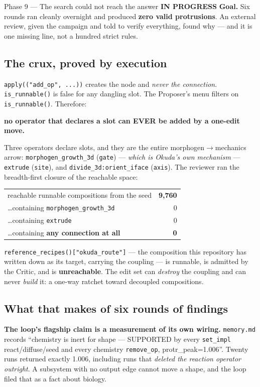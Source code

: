\documentclass[11pt,a4paper]{article}
\newcommand{\code}[1]{\texttt{#1}}
\newcommand{\prog}{\textcolor{warn}{\textbf{IN PROGRESS}}}
\begin{document}
\begin{phasebox}{Phase 9 --- The search could not reach the answer \hfill \prog}
\textbf{Goal.} Six rounds ran cleanly overnight and produced \textbf{zero valid protrusions}. An
external review, given the campaign and told to verify everything, found why --- and it is one
missing line, not a hundred strict rules.

\subsection*{The crux, proved by execution}
\code{apply(("add\_op", ...))} creates the node and \emph{never the connection}.
\code{is\_runnable()} is false for any dangling slot. The Proposer's menu filters on
\code{is\_runnable()}. Therefore:

\begin{center}\textbf{no operator that declares a slot can EVER be added by a one-edit move.}\end{center}

\noindent Three operators declare slots, and they are the entire morphogen$\to$mechanics arrow:
\code{morphogen\_growth\_3d} (\code{gate}) --- \emph{which is Okuda's own mechanism} ---
\code{extrude} (\code{site}), and \code{divide\_3d:orient\_iface} (\code{axis}). The reviewer ran
the breadth-first closure of the reachable space:

\begin{center}\small
\begin{tabular}{@{}lr@{}}
\toprule
reachable runnable compositions from the seed & \textbf{9{,}760} \\
\ldots containing \code{morphogen\_growth\_3d} & 0 \\
\ldots containing \code{extrude} & 0 \\
\ldots containing \textbf{any connection at all} & \textbf{0} \\
\bottomrule
\end{tabular}
\end{center}

\noindent \code{reference\_recipes()["okuda\_route"]} --- the composition this repository has
written down as its target, carrying the coupling --- is runnable, is admitted by the Critic, and
is \textbf{unreachable}. The edit set can \emph{destroy} the coupling and can never \emph{build}
it: a one-way ratchet toward decoupled compositions.

\subsection*{What that makes of six rounds of findings}
\textbf{The loop's flagship claim is a measurement of its own wiring.} \code{memory.md} records
``chemistry is inert for shape --- SUPPORTED by every \code{set\_impl} react/diffuse/seed and every
chemistry \code{remove\_op}, protr\_peak=1.006''. Twenty runs returned exactly 1.006, including runs
that \emph{deleted the reaction operator outright}. A subsystem with no output edge cannot move a
shape, and the loop filed that as a fact about biology.


\end{phasebox}
\end{document}
